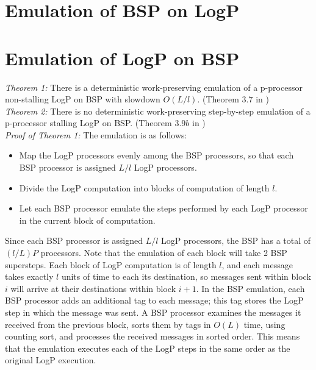 \documentclass[12pt,a4paper]{article}
\begin{document}
\newpage
\section{Emulation of BSP on LogP}


\newpage
\section{Emulation of LogP on BSP}

\emph{Theorem 1:}
There is a deterministic work-preserving emulation of a p-processor non-stalling LogP on BSP with slowdown $O(L/l)$.
(Theorem $3.7$ in \cite{Vlr03})\\

\noindent \emph{Theorem 2: }
There is no deterministic work-preserving step-by-step emulation of a p-processor stalling LogP on BSP.
(Theorem $3.9b$ in \cite{Vlr03})\\

\noindent\emph{Proof of Theorem 1:} 
The emulation is as follows:
\begin{itemize}
\item Map the LogP processors evenly among the BSP processors, so that each BSP processor is assigned $L/l$ LogP processors.
\item Divide the LogP computation into blocks of computation of length $l$.
\item Let each BSP processor emulate the steps performed by each LogP processor in the current block of computation.
\end{itemize}

Since each BSP processor is assigned $L/l$ LogP processors, the BSP has a total of $(l/L)P$ processors.
Note that the emulation of each block will take 2 BSP supersteps. Each block of LogP computation
is of length $l$, and each message takes exactly $l$ units of time to each its destination, so messages sent within block $i$ will arrive at
their destinations within block $i+1$. In the BSP emulation, each BSP processor adds an additional tag to each message; this tag stores the LogP
step in which the message was sent. A BSP processor examines the messages it received from the previous block, sorts them by tags in $O(L)$ time,
using counting sort, and processes the received messages in sorted order. This means that the emulation executes each of the LogP steps in the same
order as the original LogP execution.
\end{document}
